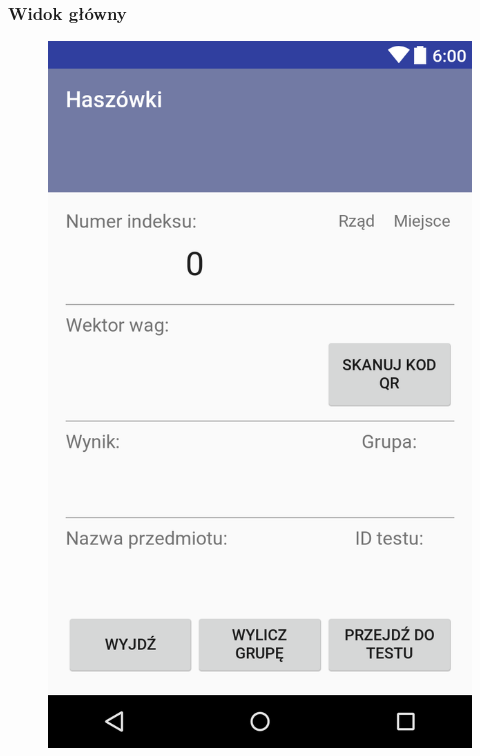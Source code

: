 \documentclass{beamer}
\begin{document}
  \begin{frame}
  	\frametitle{Widok główny}
  	\begin{center}
  		\begin{figure}[ht]
  			\centering
  			\includegraphics[scale=0.15]{layout-2016-11-29-223545.png}
  		\end{figure}
  	\end{center}
  \end{frame}
\end{document}
